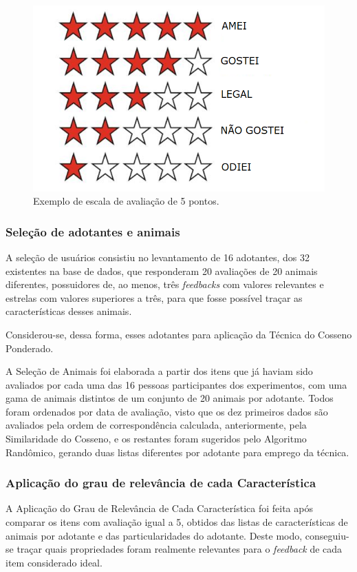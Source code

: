 \documentclass[portuguese]{textolivre}
\begin{document}
\begin{figure}[H]
	\centering
	\includegraphics[scale=0.60]{imagens/fig-016.png} 
	\caption{Exemplo de escala de avaliação de 5 pontos.}
	\label{fig:016}
\end{figure}

\subsubsection{Seleção de adotantes e animais}

A seleção de usuários consistiu no levantamento de 16 adotantes, dos 32 existentes na base de dados, que responderam 20 avaliações de 20 animais diferentes, possuidores de, ao menos, três \textit{feedbacks} com valores relevantes e estrelas com valores superiores a três, para que fosse possível traçar as características desses animais.

Considerou-se, dessa forma, esses adotantes para aplicação da Técnica do Cosseno Ponderado.

A Seleção de Animais foi elaborada a partir dos itens que já haviam sido avaliados por cada uma das 16 pessoas participantes dos experimentos, com uma gama de animais distintos de um conjunto de 20 animais por adotante. Todos foram ordenados por data de avaliação, visto que os dez primeiros dados são avaliados pela ordem de correspondência calculada, anteriormente, pela Similaridade do Cosseno, e os restantes foram sugeridos pelo Algoritmo Randômico, gerando duas listas diferentes por adotante para emprego da técnica.

\subsubsection{Aplicação do grau de relevância de cada Característica}
A Aplicação do Grau de Relevância de Cada Característica foi feita após comparar os itens com avaliação igual a 5, obtidos das listas de características de animais por adotante e das particularidades do adotante. Deste modo, conseguiu-se traçar quais propriedades foram realmente relevantes para o \emph{feedback} de cada item considerado ideal.
\end{document}
